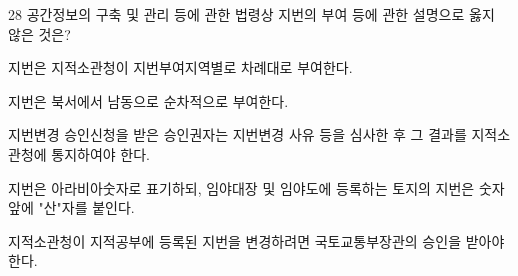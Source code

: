 \begin{question}{28}
공간정보의 구축 및 관리 등에 관한 법령상 지번의 부여 등에 관한 설명으로 옳지 않은 것은?
\begin{choices}
  \item 지번은 지적소관청이 지번부여지역별로 차례대로 부여한다.
  \item 지번은 북서에서 남동으로 순차적으로 부여한다.
  \item 지번변경 승인신청을 받은 승인권자는 지번변경 사유 등을 심사한 후 그 결과를 지적소관청에 통지하여야 한다.
  \item 지번은 아라비아숫자로 표기하되, 임야대장 및 임야도에 등록하는 토지의 지번은 숫자 앞에 "산"자를 붙인다.
  \item 지적소관청이 지적공부에 등록된 지번을 변경하려면 국토교통부장관의 승인을 받아야 한다.
\end{choices}
\end{question}
